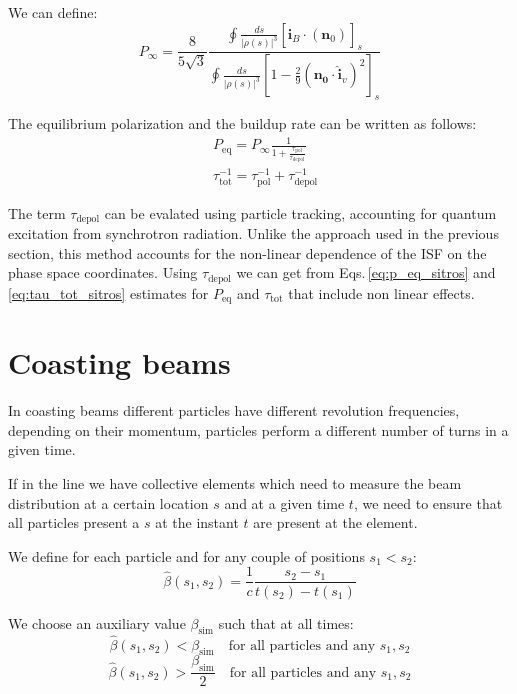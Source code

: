 We can define:
\begin{equation}
  P_{\infty} = \frac{8}{5\sqrt{3}}
  \frac
  {
   \oint \frac{ds}{|\rho(s)|^3}
    \left[\hat{\bm{i}}_B \cdot
    (\bm{n}_0)
    \right]_s
}
{
  \oint \frac{ds}{|\rho(s)|^3}
  \left[
    1 - \frac{2}{9} (\bm{n_0} \cdot \hat{\bm{i}}_v)^2
    \right]_s
}
\end{equation}

The equilibrium polarization and the buildup rate can be written as follows:
\begin{align}
  &P_\text{eq} = P_{\infty} \frac{1}{1 + \frac{\tau_\text{pol}}{\tau_\text{depol}}}
  \label{eq:p_eq_sitros}\\
  &\tau_\text{tot}^{-1} = \tau_\text{pol}^{-1} + \tau_\text{depol}^{-1}
  \label{eq:tau_tot_sitros}
\end{align}

The term $\tau_\text{depol}$ can be evalated using particle tracking, accounting for
quantum excitation from synchrotron radiation. Unlike the approach used in the previous
section, this method accounts for the non-linear dependence of the ISF on the phase space coordinates.
Using $\tau_\text{depol}$ we can get from Eqs.\,\ref{eq:p_eq_sitros} and \ref{eq:tau_tot_sitros}
estimates for $P_\text{eq}$ and $\tau_\text{tot}$ that include non linear effects.


\chapter{Coasting beams}

In coasting beams different particles have different revolution frequencies, depending on their momentum, particles perform a different number of turns in a given time. 

If in the line we have collective elements which need to measure the beam distribution at a certain location $s$ and at a given time $t$, we need to ensure that all particles present a $s$ at the instant $t$ are present at the element.

We define for each particle and for any couple of positions $s_1 < s_2$:
\begin{equation}
\hat{\beta}(s_1, s_2) = \frac{1}{c}\frac{s_2-s_1}{t(s_2) - t(s_1)}
\end{equation}

We choose an auxiliary value $\beta_\text{sim}$ such that at all times:
\begin{equation}
\hat{\beta}(s_1, s_2) < \beta_\text{sim} \quad \text{for all particles and any } s_1, s_2
\label{eq:betasim1}
\end{equation}
\begin{equation}
\hat{\beta}(s_1, s_2) > \frac{\beta_\text{sim}}{2}\quad \text{for all particles and any } s_1, s_2
\label{eq:betasim2}
\end{equation}

